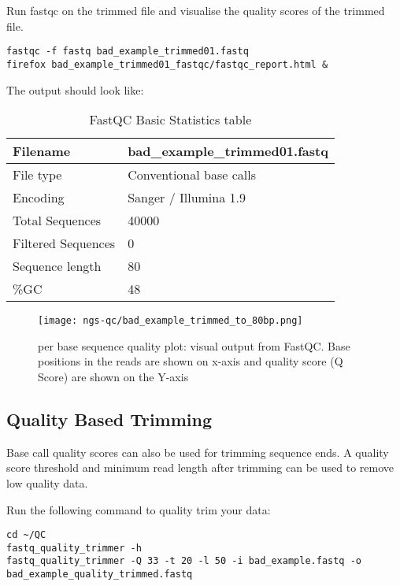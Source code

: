 \begin{steps}
Run fastqc on the trimmed file and visualise the quality scores of the trimmed file.
\begin{lstlisting}
fastqc -f fastq bad_example_trimmed01.fastq
firefox bad_example_trimmed01_fastqc/fastqc_report.html &
\end{lstlisting}

The output should look like:

\begin{table}[htbp]
  \centering
  \caption{FastQC Basic Statistics table}
    \begin{tabular}{ll}
    \toprule
    Filename & bad\_example\_trimmed01.fastq \\
    \midrule
    File type & Conventional base calls \\
    Encoding & Sanger / Illumina 1.9 \\
    Total Sequences & 40000 \\
    Filtered Sequences & 0 \\
    Sequence length & 80 \\
    \%GC  & 48 \\
    \bottomrule
    \end{tabular}%
  \label{tab:badexampletrimmed}%
\end{table}%

\begin{figure}[htb]
\centering
\texttt{[image: ngs-qc/bad\_example\_trimmed\_to\_80bp.png]}
\caption{per base sequence quality plot: visual output from FastQC. Base positions in the reads are shown on x-axis and quality score (Q Score) are shown on the Y-axis}
\label{fig:bad_example_trimmed_plot}
\end{figure}

\end{steps}

\subsection{Quality Based Trimming}
Base call quality scores can also be used for trimming sequence ends. A quality
score threshold and minimum read length after trimming can be used to remove low
quality data.

\begin{steps}
Run the following command to quality trim your data:
\begin{lstlisting}
cd ~/QC
fastq_quality_trimmer -h
fastq_quality_trimmer -Q 33 -t 20 -l 50 -i bad_example.fastq -o bad_example_quality_trimmed.fastq
\end{lstlisting}
\end{steps}


